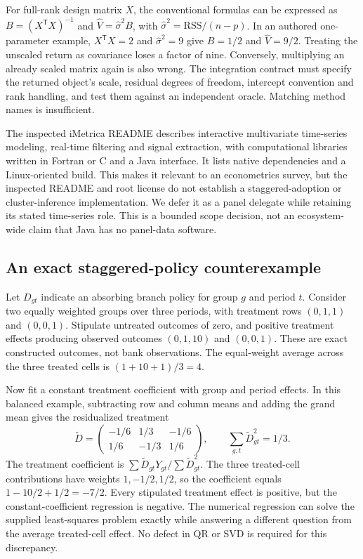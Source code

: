 For full-rank design matrix $X$, the conventional formulas can be expressed
as $B=(X^\mathsf{T}X)^{-1}$ and $\widehat V=\widehat\sigma^2 B$, with
$\widehat\sigma^2=\mathrm{RSS}/(n-p)$. In an authored one-parameter
example, $X^\mathsf{T}X=2$ and $\widehat\sigma^2=9$ give $B=1/2$ and
$\widehat V=9/2$. Treating the unscaled return as covariance loses a factor
of nine. Conversely, multiplying an already scaled matrix again is also wrong.
The integration contract must specify the returned object's scale, residual
degrees of freedom, intercept convention and rank handling, and test them
against an independent oracle. Matching method names is insufficient.
\citep{exec25_paneljava_reference}

The inspected iMetrica README describes interactive multivariate time-series
modeling, real-time filtering and signal extraction, with computational
libraries written in Fortran or C and a Java interface. It lists native
dependencies and a Linux-oriented build. This makes it relevant to an
econometrics survey, but the inspected README and root license do not
establish a staggered-adoption or cluster-inference implementation. We defer
it as a panel delegate while retaining its stated time-series role. This is
a bounded scope decision, not an ecosystem-wide claim that Java has no
panel-data software.~\citep{exec25_paneljava_imetrica}

\subsection{An exact staggered-policy counterexample}
Let $D_{gt}$ indicate an absorbing branch policy for group $g$ and period $t$.
Consider two equally weighted groups over three periods, with treatment rows
$(0,1,1)$ and $(0,0,1)$. Stipulate untreated outcomes of zero, and positive
treatment effects producing observed outcomes $(0,1,10)$ and $(0,0,1)$.
These are exact constructed outcomes, not bank observations. The equal-weight
average across the three treated cells is $(1+10+1)/3=4$.
\citep{exec25_paneljava_reference}

Now fit a constant treatment coefficient with group and period effects. In
this balanced example, subtracting row and column means and adding the grand
mean gives the residualized treatment
\[
\widetilde D=
\begin{pmatrix}-1/6&1/3&-1/6\\1/6&-1/3&1/6\end{pmatrix},
\qquad \sum_{g,t}\widetilde D_{gt}^2=1/3.
\]
The treatment coefficient is $\sum\widetilde D_{gt}Y_{gt}/
\sum\widetilde D_{gt}^2$. The three treated-cell contributions have weights
$1,-1/2,1/2$, so the coefficient equals
$1-10/2+1/2=-7/2$. Every stipulated treatment effect is positive, but the
constant-coefficient regression is negative. The numerical regression can
solve the supplied least-squares problem exactly while answering a different
question from the average treated-cell effect. No defect in QR or SVD is
required for this discrepancy.~\citep{exec25_paneljava_reference}

